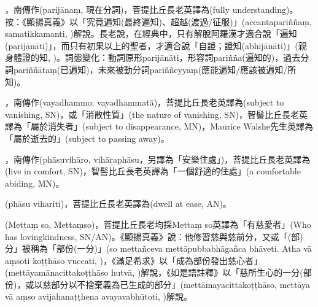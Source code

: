 \startitemgroup[noteitems]
\item{}，南傳作(parijānaṃ, 現在分詞)，菩提比丘長老英譯為(fully understanding)。按：《顯揚真義》以「究竟遍知(最終遍知)、超越(渡過/征服)」(accantapariññaṃ, samatikkamanti, )解說。長老說，在經典中，只有解脫阿羅漢才適合說「遍知(parijānāti)」，而只有初果以上的聖者，才適合說「自證；證知(abhijānāti)」(親身體證的知, )。詞態變化：動詞原形parijānāti，形容詞pariñña(遍知的)，過去分詞pariññātaṃ(已遍知)，未來被動分詞pariññeyyaṃ(應能遍知/應該被遍知/所知)。
\stopitemgroup

\startitemgroup[noteitems]
\item{}，南傳作(vayadhammo; vayadhammatā)，菩提比丘長老英譯為(subject to vanishing, SN)，或「消散性質」(the nature of vanishing, SN)，智髻比丘長老英譯為「屬於消失者」(subject to disappearance, MN)，Maurice Walshe先生英譯為「屬於逝去的」(subject to passing away)。
\stopitemgroup

\startitemgroup[noteitems]
\item{}，南傳作(phāsuvihāro, vihāraphāsu，另譯為「安樂住處」)，菩提比丘長老英譯為(live in comfort, SN)，智髻比丘長老英譯為「一個舒適的住處」(a comfortable abiding, MN)。
\item{}(phāsu vihariti)，菩提比丘長老英譯為(dwell at ease, AN)。
\stopitemgroup

\startitemgroup[noteitems]
\item{}(Mettaṃ so, Mettaṃso)，菩提比丘長老均採Mettaṃ so英譯為「有慈愛者」(Who has lovingkindness, SN/AN)。《顯揚真義》說：他修習慈與慈前分，又或「(部)分」被稱為「部份(一分)」(so mettañceva mettāpubbabhāgañca bhāveti. Atha vā aṃsoti koṭṭhāso vuccati, )，《滿足希求》以「成為部份發出慈心者」(mettāyamānacittakoṭṭhāso hutvā, )解說，《如是語註釋》以「慈所生心的一分(部份)，或以慈部分以不捨棄義為已生成的部分」(mettāmayacittakoṭṭhāso, mettāya vā aṃso avijahanaṭṭhena avayavabhūtoti, )解說。
\stopitemgroup

